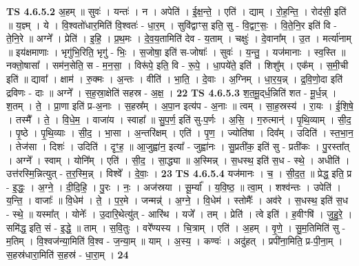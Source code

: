 \documentclass[17pt]{extarticle}
\begin{document}
                  \newline
                                \textbf{ TS 4.6.5.2} \newline
                  अ॒हम् ॥ सुवः॑ । यन्तः॑ । न । अपेति॑ । ई॒क्ष॒न्ते॒ । एति॑ । द्याम् । रो॒ह॒न्ति॒ । रोद॑सी॒ इति॑ ॥ य॒ज्ञ्म् । ये । वि॒श्वतो॑धार॒मिति॑ वि॒श्वतः॑ - धा॒र॒म् । सुवि॑द्वाꣳस॒ इति॒ सु - वि॒द्वाꣳ॒॒सः॒ । वि॒ते॒नि॒र इति॑ वि - ते॒नि॒रे ॥ अग्ने᳚ । प्रेति॑ । इ॒हि॒ । प्र॒थ॒मः । दे॒व॒य॒तामिति॑ देव - य॒ताम् । चक्षुः॑ । दे॒वाना᳚म् । उ॒त । मर्त्या॑नाम् ॥ इय॑क्षमाणाः । भृगु॑भि॒रिति॒ भृगु॑ - भिः॒ । स॒जोषा॒ इति॑ स-जोषाः᳚ । सुवः॑ । य॒न्तु॒ । यज॑मानाः । स्व॒स्ति ॥ नक्तो॒षासा᳚ । सम॑न॒सेति॒ स - म॒न॒सा॒ । विरू॑पे॒ इति॒ वि - रू॒पे॒ । धा॒पये॑ते॒ इति॑ । शिशु᳚म् । एक᳚म् । स॒मी॒ची इति॑ ॥ द्यावा᳚ । क्षाम॑ । रु॒क्मः । अ॒न्तः । वीति॑ । भा॒ति॒ । दे॒वाः । अ॒ग्निम् । धा॒र॒य॒न्न् । द्र॒वि॒णो॒दा इति॑ द्रविणः - दाः ॥ अग्ने᳚ । स॒ह॒स्रा॒क्षेति॑ सहस्र - अ॒क्ष॒ । \textbf{  22} \newline
                  \newline
                                \textbf{ TS 4.6.5.3} \newline
                  श॒त॒मू॒द्‌र्ध॒न्निति॑ शत - मू॒र्ध॒न्न् । श॒तम् । ते॒ । प्रा॒णा इति॑ प्र-अ॒नाः । स॒हस्र᳚म् । अ॒पा॒न इत्य॑प - अ॒नाः ॥ त्वम् । सा॒ह॒स्रस्य॑ । रा॒यः । ई॒शि॒षे॒ । तस्मै᳚ । ते॒ । वि॒धे॒म॒ । वाजा॑य । स्वाहा᳚ ॥ सु॒प॒र्ण॒ इति॑ सु-प॒र्णः । अ॒सि॒ । ग॒रुत्मान्॑ । पृ॒थि॒व्याम् । सी॒द॒ । पृ॒ष्ठे । पृ॒थि॒व्याः । सी॒द॒ । भा॒सा । अ॒न्तरि॑क्षम् । एति॑ । पृ॒ण॒ । ज्योति॑षा । दिव᳚म् । उदिति॑ । स्त॒भा॒न॒ । तेज॑सा । दिशः॑ । उदिति॑ । दृꣳ॒॒ह॒ ॥ आ॒जुह्वा॑न॒ इत्या᳚ - जुह्वा॑नः । सु॒प्रती॑क॒ इति॑ सु - प्रती॑कः । पु॒रस्ता᳚त् । अग्ने᳚ । स्वाम् । योनि᳚म् । एति॑ । सी॒द॒ । सा॒द्ध्या ॥ अ॒स्मिन्न् । स॒धस्थ॒ इति॑ स॒ध - स्थे॒ । अधीति॑ । उत्त॑रस्मि॒न्नित्युत् - त॒र॒स्मि॒न्न् । विश्वे᳚ । दे॒वाः॒ । \textbf{  23} \newline
                  \newline
                                \textbf{ TS 4.6.5.4} \newline
                  यज॑मानः । च॒ । सी॒द॒त॒ ॥ प्रेद्ध॒ इति॒ प्र - इ॒द्धः॒ । अ॒ग्ने॒ । दी॒दि॒हि॒ । पु॒रः । नः॒ । अज॑स्रया । सू॒र्म्या᳚ । य॒वि॒ष्ठ॒ ॥ त्वा॒म् । शश्व॑न्तः । उपेति॑ । य॒न्ति॒ । वाजाः᳚ ॥ वि॒धेम॑ । ते॒ । प॒र॒मे । जन्मन्न्॑ । अ॒ग्ने॒ । वि॒धेम॑ । स्तोमैः᳚ । अव॑रे । स॒धस्थ॒ इति॑ स॒ध - स्थे॒ ॥ यस्मा᳚त् । योनेः᳚ । उ॒दारि॒थेत्यु॑त् - आरि॑थ । यजे᳚ । तम् । प्रेति॑ । त्वे इति॑ । ह॒वीꣳषि॑ । जु॒हु॒रे॒ । समि॑द्ध॒ इति॒ सं - इ॒द्धे॒ ॥ ताम् । स॒वि॒तुः । वरे᳚ण्यस्य । चि॒त्राम् । एति॑ । अ॒हम् । वृ॒णे॒ । सु॒म॒तिमिति॑ सु - म॒तिम् । वि॒श्वज॑न्या॒मिति॑ वि॒श्व - ज॒न्या॒म् ॥ याम् । अ॒स्य॒ । कण्वः॑ । अदु॑हत् । प्रपी॑ना॒मिति॒ प्र-पी॒ना॒म् । स॒हस्र॑धारा॒मिति॑ स॒हस्र॑ - धा॒रा॒म् । \textbf{  24} \newline
\end{document}
